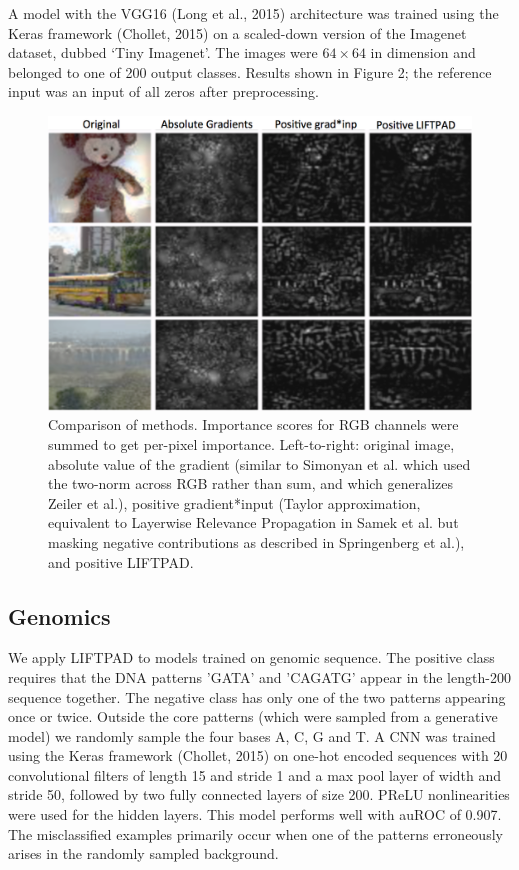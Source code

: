 \documentclass{article}
\begin{document}
A model with the VGG16 (Long et al., 2015) architecture was trained using the Keras framework (Chollet, 2015) on a scaled-down version of the Imagenet dataset, dubbed `Tiny Imagenet'. The images were $64 \times 64$ in dimension and belonged to one of 200 output classes. Results shown in Figure 2; the reference input was an input of all zeros after preprocessing.
\begin{figure}[!ht]
\begin{center}
\includegraphics[scale=0.4]{TinyImagenetLIFTPAD.png}
\caption{Comparison of methods. Importance scores for RGB channels were summed to get per-pixel importance. Left-to-right: original image, absolute value of the gradient (similar to Simonyan et al. which used the two-norm across RGB rather than sum, and which generalizes Zeiler et al.), positive gradient*input (Taylor approximation, equivalent to Layerwise Relevance Propagation in Samek et al. but masking negative contributions as described in Springenberg et al.), and positive LIFTPAD.}
\end{center}
\vspace{-20px}
\end{figure}
\subsection{Genomics}
We apply LIFTPAD to models trained on genomic sequence. The positive class requires that the DNA patterns 'GATA' and 'CAGATG' appear in the length-200 sequence together. The negative class has only one of the two patterns appearing once or twice. Outside the core patterns (which were sampled from a generative model) we randomly sample the four bases A, C, G and T. A CNN was trained using the Keras framework (Chollet, 2015) on one-hot encoded sequences with 20 convolutional filters of length 15 and stride 1 and a max pool layer of width and stride 50, followed by two fully connected layers of size 200. PReLU nonlinearities were used for the hidden layers. This model performs well with auROC of 0.907. The misclassified examples primarily occur when one of the patterns erroneously arises in the randomly sampled background. %
\end{document}
